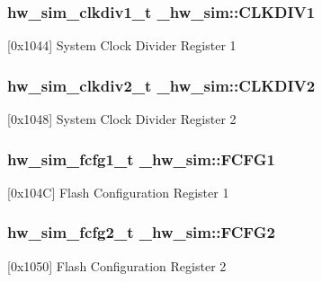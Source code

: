 \subsubsection[{\texorpdfstring{C\+L\+K\+D\+I\+V1}{CLKDIV1}}]{ {\bf hw\+\_\+sim\+\_\+clkdiv1\+\_\+t} \+\_\+hw\+\_\+sim\+::\+C\+L\+K\+D\+I\+V1}\hypertarget{struct__hw__sim_a8cfdba863c98effcd389e8c3a3ba27f0}{}\label{struct__hw__sim_a8cfdba863c98effcd389e8c3a3ba27f0}
\mbox{[}0x1044\mbox{]} System Clock Divider Register 1 
\subsubsection[{\texorpdfstring{C\+L\+K\+D\+I\+V2}{CLKDIV2}}]{ {\bf hw\+\_\+sim\+\_\+clkdiv2\+\_\+t} \+\_\+hw\+\_\+sim\+::\+C\+L\+K\+D\+I\+V2}\hypertarget{struct__hw__sim_a2d48b9d1699a4bf9b24693778374019e}{}\label{struct__hw__sim_a2d48b9d1699a4bf9b24693778374019e}
\mbox{[}0x1048\mbox{]} System Clock Divider Register 2 
\subsubsection[{\texorpdfstring{F\+C\+F\+G1}{FCFG1}}]{ {\bf hw\+\_\+sim\+\_\+fcfg1\+\_\+t} \+\_\+hw\+\_\+sim\+::\+F\+C\+F\+G1}\hypertarget{struct__hw__sim_a5c9e113ebd848ccfd7f2dd046d36b565}{}\label{struct__hw__sim_a5c9e113ebd848ccfd7f2dd046d36b565}
\mbox{[}0x104C\mbox{]} Flash Configuration Register 1 
\subsubsection[{\texorpdfstring{F\+C\+F\+G2}{FCFG2}}]{ {\bf hw\+\_\+sim\+\_\+fcfg2\+\_\+t} \+\_\+hw\+\_\+sim\+::\+F\+C\+F\+G2}\hypertarget{struct__hw__sim_a8d054b9ce92cf98464c6357d8f30f254}{}\label{struct__hw__sim_a8d054b9ce92cf98464c6357d8f30f254}
\mbox{[}0x1050\mbox{]} Flash Configuration Register 2 
